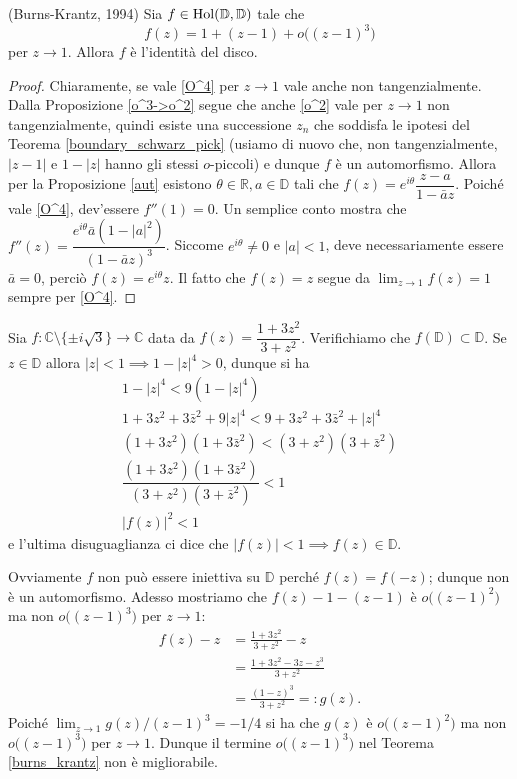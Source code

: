 \begin{thm} \label{burns_krantz}
  (Burns-Krantz, 1994) Sia $f \in \text{\normalfont{Hol}}(\mathbb{D},\mathbb{D})$ tale che
  \begin{equation} \label{O^4}
    f(z)=1+(z-1)+o\bigl((z-1)^3\bigr)
  \end{equation}
  per $z \longrightarrow 1$. Allora $f$ è l'identità del disco.
\end{thm}

\begin{proof} 
  Chiaramente, se vale \eqref{O^4} per $z \longrightarrow 1$ vale anche non tangenzialmente.
  Dalla Proposizione \ref{o^3->o^2} segue che anche \eqref{o^2} vale per $z \longrightarrow 1$ non tangenzialmente, quindi esiste una successione $z_n$ che soddisfa le ipotesi del Teorema \ref{boundary_schwarz_pick} (usiamo di nuovo che, non tangenzialmente, $|z-1|$ e $1-|z|$ hanno gli stessi $o$-piccoli) e dunque $f$ è un automorfismo.
  Allora per la Proposizione \ref{aut} esistono $\theta \in \mathbb{R}, a \in \mathbb{D}$ tali che $f(z)=e^{i\theta}\dfrac{z-a}{1-\bar{a}z}$. Poiché vale \eqref{O^4}, dev'essere $f''(1)=0$. Un semplice conto mostra che $f''(z)=\dfrac{e^{i\theta}\bar{a}(1-|a|^2)}{(1-\bar{a}z)^3}$.
  Siccome $e^{i\theta}\not=0$ e $|a|<1$, deve necessariamente essere $\bar{a}=0$, perciò $f(z)=e^{i\theta}z$. Il fatto che $f(z)=z$ segue da $\displaystyle \lim_{z \longrightarrow 1} f(z)=1$ sempre per \eqref{O^4}.
\end{proof}

\begin{ex}
  Sia $f:\mathbb{C}\setminus\{\pm i\sqrt{3}\} \longrightarrow \mathbb{C}$ data da $f(z)=\dfrac{1+3z^2}{3+z^2}$. Verifichiamo che $f(\mathbb{D}) \subset \mathbb{D}$. Se $z \in \mathbb{D}$ allora $|z|<1 \implies 1-|z|^4>0$, dunque si ha
  \begin{gather*}
    1-|z|^4 < 9(1-|z|^4) \\
    1+3z^2+3\bar{z}^2+9|z|^4 < 9+3z^2+3\bar{z}^2+|z|^4 \\
    (1+3z^2)(1+3\bar{z}^2) < (3+z^2)(3+\bar{z}^2) \\
    \dfrac{(1+3z^2)(1+3\bar{z}^2)}{(3+z^2)(3+\bar{z}^2)} < 1 \\
    |f(z)|^2<1
  \end{gather*}
  e l'ultima disuguaglianza ci dice che $|f(z)|<1 \implies f(z) \in \mathbb{D}$.

  Ovviamente $f$ non può essere iniettiva su $\mathbb{D}$ perché $f(z)=f(-z)$; dunque non è un automorfismo. Adesso mostriamo che $f(z)-1-(z-1)$ è $o\bigl((z-1)^2\bigr)$ ma non $o\bigl((z-1)^3\bigr)$ per $z \longrightarrow 1$:
  \begin{align*}
    f(z)-z & =\frac{1+3z^2}{3+z^2}-z \\
    & =\frac{1+3z^2-3z-z^3}{3+z^2} \\
    & =\frac{(1-z)^3}{3+z^2}=:g(z).
  \end{align*}
  Poiché $\displaystyle \lim_{z \longrightarrow 1} g(z)/(z-1)^3=-1/4$ si ha che $g(z)$ è $o\bigl((z-1)^2\bigr)$ ma non $o\bigl((z-1)^3\bigr)$ per $z \longrightarrow 1$. Dunque il termine $o\bigl((z-1)^3\bigr)$ nel Teorema \ref{burns_krantz} non è migliorabile.
\end{ex}
